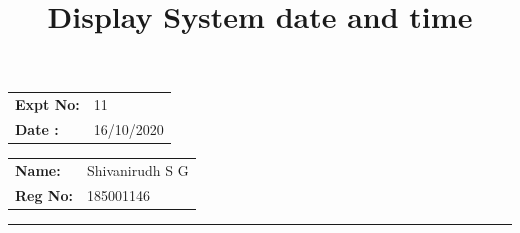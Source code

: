 \documentclass[10pt,a4paper]{article}
\title{\bf Display System date and time}
\author{\vspace{-10ex}}
\date{\vspace{-10ex}}
\begin{document}
\maketitle

\begin{minipage}{0.45\textwidth}
        \begin{tabular}{l l}
            \textbf{Expt No:}&11\\
            \textbf{Date :}&16/10/2020
        \end{tabular}
\end{minipage}%
\begin{minipage}{0.45\textwidth}
        \begin{tabular}{l l}
             \textbf{Name:}& Shivanirudh S G  \\
             \textbf{Reg No:} & 185001146 
        \end{tabular}
\end{minipage}
\vspace{1cm}
\hrule
\end{document}
